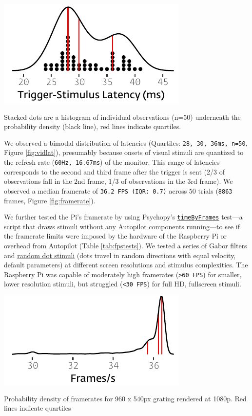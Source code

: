 \documentclass[nohyper, justified, notitlepage, marginals=raggedright,twoside=false,debug]{tufte-autopilot}
\begin{document}
\begin{marginfigure}[1.8cm]
\includegraphics[]{figures/test_6_visual_lags.pdf}
\caption{Stacked dots are a histogram of individual observations (n=50) underneath the probability density (black line), red lines indicate quartiles.}
\label{fig:vidlat}
\end{marginfigure}

We observed a bimodal distribution of latencies (Quartiles: \texttt{28, 30, 36ms, n=50}, Figure \ref{fig:vidlat}), presumably because onsets of visual stimuli are quantized to the refresh rate (\texttt{60Hz, 16.67ms}) of the monitor. This range of latencies corresponds to the second and third frame after the trigger is sent (2/3 of observations fall in the 2nd frame, 1/3 of observations in the 3rd frame). We observed a median framerate of \texttt{36.2 FPS (IQR: 0.7)} across 50 trials (\texttt{8863} frames, Figure \ref{fig:framerate}). 

We further tested the Pi's framerate by using Psychopy's \href{https://github.com/psychopy/psychopy/blob/3.1/psychopy/demos/coder/timing/timeByFrames.py}{\texttt{timeByFrames}} test---a script that draws stimuli without any Autopilot components running---to see if the framerate limits were imposed by the hardware of the Raspberry Pi or overhead from Autopilot (Table \ref{tab:fpstests}). We tested a series of Gabor filters and \href{https://www.psychopy.org/api/visual/dotstim.html#psychopy.visual.DotStim}{random dot stimuli} (dots travel in random directions with equal velocity, default parameters) at different screen resolutions and stimulus complexities. The Raspberry Pi was capable of moderately high framerates (\texttt{>60 FPS}) for smaller, lower resolution stimuli, but struggled (\texttt{<30 FPS}) for full HD, fullscreen stimuli.

\begin{marginfigure}[-0.7cm]
\includegraphics[]{figures/test_7_fps.pdf}
\caption{Probability density of framerates for 960 x 540px grating rendered at 1080p. Red lines indicate quartiles}
\label{fig:framerate}
\end{marginfigure}
\end{document}
